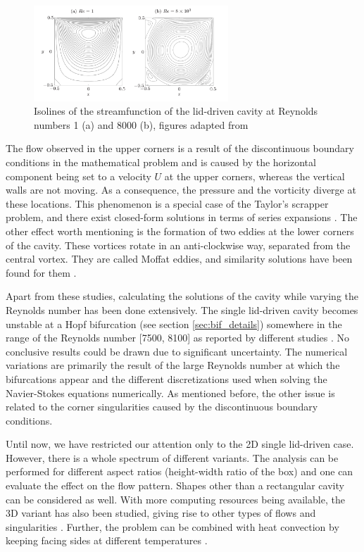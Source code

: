 \begin{figure}[ht!]
\begin{center}
  \includegraphics[width=0.65\textwidth]{figs/fig_kuhlmann2019}
\end{center}
\caption{Isolines of the streamfunction of the lid-driven cavity at Reynolds
  numbers 1 (a) and 8000 (b), figures adapted from \cite{kuhlmann2019}}
\label{fig:Re_cav_simple}
\end{figure}

The flow observed in the upper corners is a result of the discontinuous
boundary conditions in the mathematical problem and is caused by the horizontal
component being set to a velocity $U$ at the upper corners, whereas the
vertical walls are not moving. As a consequence, the pressure and the vorticity
diverge at these locations. This phenomenon is a special case of the Taylor's
scrapper problem, and there exist closed-form solutions in terms of series
expansions \citep{kuhlmann2019}. The other effect worth mentioning is the
formation of two eddies at the lower corners of the cavity. These vortices
rotate in an anti-clockwise way, separated from the central vortex. They are
called Moffat eddies, and similarity solutions have been found for them
\citep{moffatt1964}.

Apart from these studies, calculating the solutions of the cavity while varying
the Reynolds number has been done extensively. The single lid-driven cavity
becomes unstable at a Hopf bifurcation (see section \ref{sec:bif_details})
somewhere in the range of the Reynolds number [7500, 8100] as reported by
different studies \citep{kuhlmann2019}. No conclusive results could be drawn
due to significant uncertainty. The numerical variations are primarily the
result of the large Reynolds number at which the bifurcations appear and the
different discretizations used when solving the Navier-Stokes equations
numerically. As mentioned before, the other issue is related to the corner
singularities caused by the discontinuous boundary conditions.

Until now, we have restricted our attention only to the 2D single lid-driven
case. However, there is a whole spectrum of different variants. The analysis
can be performed for different aspect ratios (height-width ratio of the box)
and one can evaluate the effect on the flow pattern. Shapes other than a
rectangular cavity can be considered as well. With more computing resources
being available, the 3D variant has also been studied, giving rise to other
types of flows and singularities \citep{lopez2017}. Further, the problem can be
combined with heat convection by keeping facing sides at different temperatures
\citep{koseff1985}. \\

